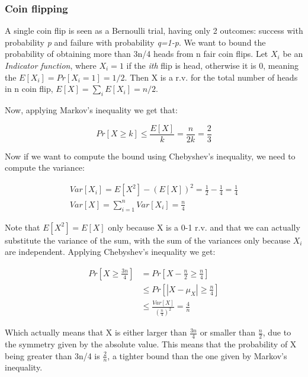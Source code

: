 \documentclass[11pt]{article}
\begin{document}
\subsubsection{Coin flipping}
A single coin flip is seen as a Bernoulli trial, having only 2 outcomes: success with probability \textit{p} and failure with probability \textit{q=1-p}. We want to bound the probability of obtaining more than 3n/4 heads from n fair coin flips.  Let \textit{$X_i$} be an \textit{Indicator function}, where $X_i = 1$ if the  \textit{ith} flip is head, otherwise it is 0, meaning the $E[X_i] = Pr[X_i = 1] = 1/2$. Then X is a r.v. for the total number of heads in n coin flip, $ E[X] = \sum_iE[X_i] = n/2$. 

Now, applying Markov's inequality we get that:

\begin{equation}
   Pr[X \geq k] \leq \frac{E[X]}{k} = \frac{n}{2k} = \frac{2}{3}
\end{equation}
 
\medskip
Now if we want to compute the bound using Chebyshev's inequality, we need to compute the variance:

\begin{equation}
\begin{split}
Var[X_i] = E[X^2] - (E[X])^2 = \frac{1}{2} - \frac{1}{4} = \frac{1}{4} \\
   Var[X] = \sum_{i=1}^n Var[X_i] = \frac{n}{4}
\end{split}     
\end{equation}

Note that $E[X^2] = E[X]$ only because X is a 0-1 r.v. and that we can actually substitute the variance of the sum, with the sum of the variances only because $X_i$ are independent. Applying Chebyshev's inequality we get: 

\begin{equation}
\begin{split}
  Pr[X \geq \frac{3n}{4}]& = Pr[X - \frac{n}{2} \geq \frac{n}{4}] \\
   & \leq Pr[|X - \mu_X| \geq \frac{n}{4}]  \\
   & \leq \frac{Var[X]}{(\frac{n}{4})^2} = \frac{4}{n}
\end{split}
\end{equation}

Which actually means that X is either larger than $\frac{3n}{4}$ or smaller than $\frac{n}{2}$, due to the symmetry given by the absolute value. This means that the probability of X being greater than 3n/4 is $\frac{2}{n}$, a tighter bound than the one given by Markov's inequality. 
 
\end{document}
